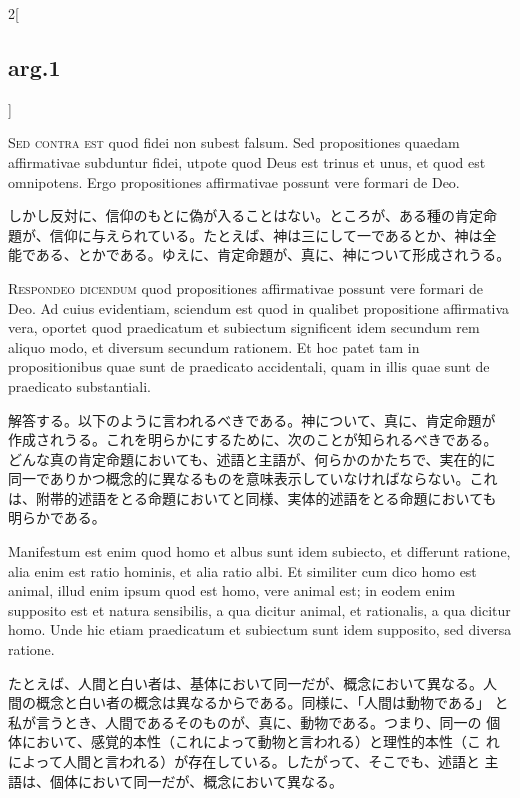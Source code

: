 \documentclass[paper=a4paper,fontsize=10pt,jafontsize=9pt,titlepage]{jlreq}
\begin{document}
\begin{paracol}{2}[\subsection{arg.1}]
\switchcolumn*[\subsection{s.c.}]

{\scshape Sed contra est} quod fidei non subest falsum. Sed
propositiones quaedam affirmativae subduntur fidei, utpote quod Deus
est trinus et unus, et quod est omnipotens. Ergo propositiones
affirmativae possunt vere formari de Deo.

\switchcolumn

しかし反対に、信仰のもとに偽が入ることはない。ところが、ある種の肯定命
題が、信仰に与えられている。たとえば、神は三にして一であるとか、神は全
能である、とかである。ゆえに、肯定命題が、真に、神について形成されうる。


{\scshape Respondeo dicendum} quod propositiones affirmativae possunt
vere formari de Deo. Ad cuius evidentiam, sciendum est quod in
qualibet propositione affirmativa vera, oportet quod praedicatum et
subiectum significent idem secundum rem aliquo modo, et diversum
secundum rationem. Et hoc patet tam in propositionibus quae sunt de
praedicato accidentali, quam in illis quae sunt de praedicato
substantiali.

\switchcolumn

解答する。以下のように言われるべきである。神について、真に、肯定命題が
作成されうる。これを明らかにするために、次のことが知られるべきである。
どんな真の肯定命題においても、述語と主語が、何らかのかたちで、実在的に
同一でありかつ概念的に異なるものを意味表示していなければならない。これ
は、附帯的述語をとる命題においてと同様、実体的述語をとる命題においても
明らかである。

\switchcolumn*

Manifestum est enim quod homo et albus sunt idem subiecto, et
differunt ratione, alia enim est ratio hominis, et alia ratio albi. Et
similiter cum dico homo est animal, illud enim ipsum quod est homo,
vere animal est; in eodem enim supposito est et natura sensibilis, a
qua dicitur animal, et rationalis, a qua dicitur homo.  Unde hic etiam
praedicatum et subiectum sunt idem supposito, sed diversa ratione.

\switchcolumn

たとえば、人間と白い者は、基体において同一だが、概念において異なる。人
間の概念と白い者の概念は異なるからである。同様に、「人間は動物である」
と私が言うとき、人間であるそのものが、真に、動物である。つまり、同一の
個体において、感覚的本性（これによって動物と言われる）と理性的本性（こ
れによって人間と言われる）が存在している。したがって、そこでも、述語と
主語は、個体において同一だが、概念において異なる。


\end{paracol}
\end{document}
